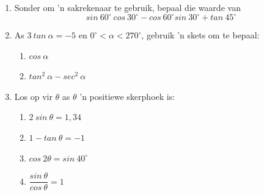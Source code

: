 \begin{eocexercises}{}

\begin{enumerate}[itemsep=6pt, label=\textbf{\arabic*}. ] 
\item Sonder om 'n sakrekenaar te gebruik, bepaal die waarde van
\begin{equation*}
sin~60^{\circ}~cos~30^{\circ}-cos~60^{\circ}sin~30^{\circ} + tan~45^{\circ}
\end{equation*}
\item As $3~tan~\alpha = -5$ en $0^{\circ} < \alpha < 270^{\circ}$, gebruik 'n skets om te bepaal:
    \begin{enumerate}[noitemsep, label=\textbf{(\alph*)} ]
    \item $cos~\alpha$
    \item $tan^{2}~\alpha - sec^{2}~\alpha$
    \end{enumerate}
\item Los op vir $\theta$ as $\theta$ 'n positiewe skerphoek is:
    \begin{enumerate}[noitemsep, label=\textbf{(\alph*)} ]
    \item $2~sin~\theta = 1,34$
    \item $1 - tan~\theta = -1$
    \item $cos~2\theta = sin~40^{\circ}$ 
    \item $\dfrac{sin~\theta}{cos~\theta}= 1$
    \end{enumerate}



\end{enumerate}
\end{eocexercises}
